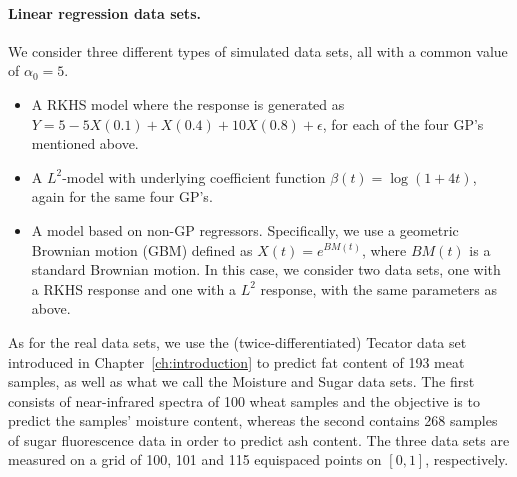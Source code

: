 \paragraph{Linear regression data sets.} We consider three different types of simulated data sets, all with a common value of \(\alpha_0=5\).
\begin{itemize}
  \item A RKHS model where the response is generated as \(Y=5 -5X(0.1) + X(0.4) + 10X(0.8) + \epsilon\), for each of the four GP's mentioned above.
  \item A \(L^2\)-model with underlying coefficient function \(\beta(t)=\log(1+4t)\), again for the same four GP's.
  \item A model based on non-GP regressors. Specifically, we use a geometric Brownian motion (GBM) defined as \(X(t)=e^{BM(t)}\), where \(BM(t)\) is a standard Brownian motion. In this case, we consider two data sets, one with a RKHS response and one with a \(L^2\) response, with the same parameters as above.
\end{itemize}
As for the real data sets, we use the (twice-differentiated) Tecator data set introduced in Chapter~\ref{ch:introduction} to predict fat content of 193 meat samples, as well as what we call the Moisture \citep{kalivas1997two} and Sugar \citep{bro1999exploratory} data sets. The first consists of near-infrared spectra of 100 wheat samples and the objective is to predict the samples' moisture content, whereas the second contains 268 samples of sugar fluorescence data in order to predict ash content. The three data sets are measured on a grid of 100, 101 and 115 equispaced points on \([0, 1]\), respectively.

